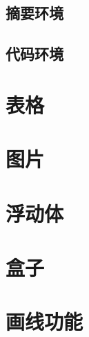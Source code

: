 \leavevmode\nobreakspace

\subsection{摘要环境}

\leavevmode\nobreakspace

\subsection{代码环境}

\leavevmode\nobreakspace

\section{表格}

\leavevmode\nobreakspace

\section{图片}

\leavevmode\nobreakspace

\section{浮动体}

\leavevmode\nobreakspace

\section{盒子}\label{sect:box}

\leavevmode\nobreakspace

\section{画线功能}\label{sect:rule}

\leavevmode\nobreakspace

\endinput